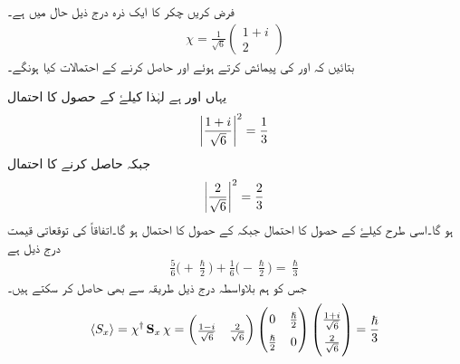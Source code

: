 فرض کریں  چکر کا ایک ذرہ درج ذیل حال میں ہے۔
\begin{align*} 
 \chi=\frac{1}{\sqrt{6}}\begin{pmatrix} 1+i \\ 2 \end{pmatrix} 
 \end{align*}
بتائیں  کہ  اور  کی پیمائش کرتے  ہوئے  اور  حاصل کرنے کے احتمالات کیا ہونگے۔


\quad
یہاں  اور  ہے  لہٰذا  کیلۓ   کے حصول کا احتمال
\begin{align*}
 \abs{\frac{1+i}{\sqrt{6}}}^2=\frac{1}{3} 
\end{align*}
  جبکہ  حاصل کرنے کا احتمال
  \begin{align*}
   \abs{\frac{2}{\sqrt{6}}}^2 =\frac{2}{3} 
  \end{align*}
   ہو گا۔اسی طرح    کیلۓ  کے حصول کا احتمال    جبکہ  کے حصول کا احتمال
   ہو گا۔اتفاقاً  کی توقعاتی قیمت درج ذیل ہے
\begin{align*} 
 \frac{5}{6}\big(+\frac{\hslash}{2}\big)+\frac{1}{6}\big(-\frac{\hslash}{2}\big)=\frac{\hslash}{3} 
 \end{align*}
جس کو ہم   بلاواسطہ  درج ذیل طریقہ سے بھی حاصل کر سکتے ہیں۔
\begin{align*} 
\renewcommand{\arraystretch}{1.5}
 \langle S_{x}\rangle=\chi^{\dagger}\mat{S}_{x}\chi=\begin{pmatrix}\frac{1-i}{\sqrt{6}} & \frac{2}{\sqrt{6}} \end{pmatrix} \begin{pmatrix} 0&\tfrac{\hslash}{2} \\ \tfrac{\hslash}{2}&0 \end{pmatrix} \begin{pmatrix}\tfrac{1+i}{\sqrt{6}} \\ \tfrac{2}{\sqrt{6}}\end{pmatrix} =\frac{\hslash}{3}
 \end{align*} 


